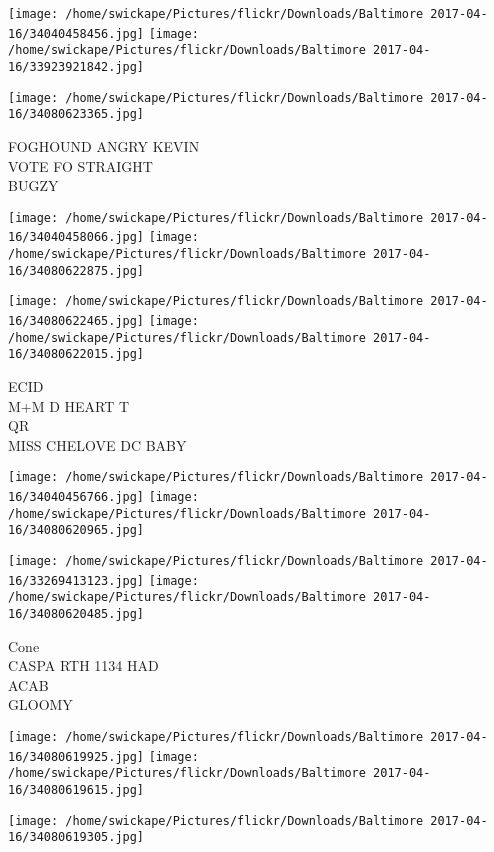 \documentclass[10pt,letterpaper]{article}
\begin{document}
\texttt{[image: /home/swickape/Pictures/flickr/Downloads/Baltimore 2017-04-16/34040458456.jpg]}
\texttt{[image: /home/swickape/Pictures/flickr/Downloads/Baltimore 2017-04-16/33923921842.jpg]}

\vspace{0.25in}
\texttt{[image: /home/swickape/Pictures/flickr/Downloads/Baltimore 2017-04-16/34080623365.jpg]}

FOGHOUND ANGRY KEVIN\\
VOTE FO STRAIGHT\\
BUGZY\\
\pagebreak

\texttt{[image: /home/swickape/Pictures/flickr/Downloads/Baltimore 2017-04-16/34040458066.jpg]}
\texttt{[image: /home/swickape/Pictures/flickr/Downloads/Baltimore 2017-04-16/34080622875.jpg]}

\texttt{[image: /home/swickape/Pictures/flickr/Downloads/Baltimore 2017-04-16/34080622465.jpg]}
\texttt{[image: /home/swickape/Pictures/flickr/Downloads/Baltimore 2017-04-16/34080622015.jpg]}

ECID\\
M+M D HEART T\\
QR\\
MISS CHELOVE DC BABY\\
\pagebreak

\texttt{[image: /home/swickape/Pictures/flickr/Downloads/Baltimore 2017-04-16/34040456766.jpg]}
\texttt{[image: /home/swickape/Pictures/flickr/Downloads/Baltimore 2017-04-16/34080620965.jpg]}

\texttt{[image: /home/swickape/Pictures/flickr/Downloads/Baltimore 2017-04-16/33269413123.jpg]}
\texttt{[image: /home/swickape/Pictures/flickr/Downloads/Baltimore 2017-04-16/34080620485.jpg]}

Cone\\
CASPA RTH 1134 HAD\\
ACAB\\
GLOOMY\\
\pagebreak

\texttt{[image: /home/swickape/Pictures/flickr/Downloads/Baltimore 2017-04-16/34080619925.jpg]}
\texttt{[image: /home/swickape/Pictures/flickr/Downloads/Baltimore 2017-04-16/34080619615.jpg]}

\texttt{[image: /home/swickape/Pictures/flickr/Downloads/Baltimore 2017-04-16/34080619305.jpg]}
\end{document}
